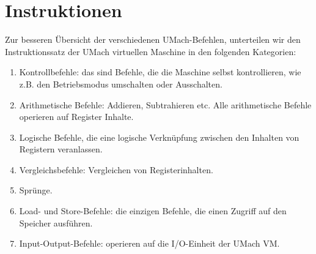 \section{Instruktionen}

Zur besseren Übersicht der verschiedenen UMach-Befehlen, unterteilen wir den
\gls{Instruktionssatz} der UMach virtuellen Maschine in den folgenden Kategorien:

\begin{enumerate}
  \item Kontrollbefehle: das sind Befehle, die die Maschine selbst
    kontrollieren, wie z.B. den Betriebsmodus umschalten oder Ausschalten.
  \item Arithmetische Befehle: Addieren, Subtrahieren etc. Alle arithmetische
    Befehle operieren auf Register Inhalte.
  \item Logische Befehle, die eine logische Verknüpfung zwischen den Inhalten
    von Registern veranlassen.
  \item Vergleichsbefehle: Vergleichen von Registerinhalten.
  \item Sprünge.
  \item Load- und Store-Befehle: die einzigen Befehle, die einen Zugriff auf den
    Speicher ausführen.
  \item Input-Output-Befehle: operieren auf die I/O-Einheit der UMach VM.
\end{enumerate}





